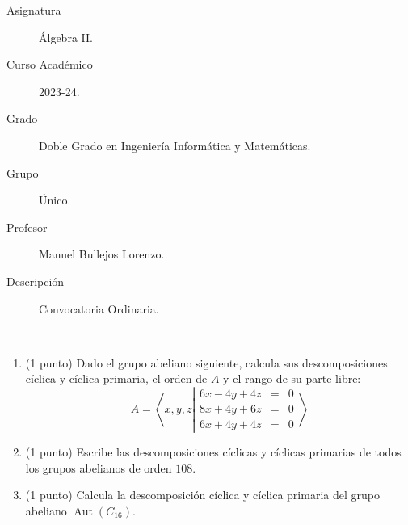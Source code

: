 \documentclass[12pt]{article}
\DeclareMathOperator{\Aut}{Aut}
\begin{document}

    
    

    \begin{description}
        \item[Asignatura] Álgebra II.
        \item[Curso Académico] 2023-24.
        \item[Grado] Doble Grado en Ingeniería Informática y Matemáticas.
        \item[Grupo] Único.
        \item[Profesor] Manuel Bullejos Lorenzo.
        \item[Descripción] Convocatoria Ordinaria.
    
    \end{description}
    \newpage

    \begin{ejercicio}~
        \begin{enumerate}
            \item (1 punto) Dado el grupo abeliano siguiente, calcula sus descomposiciones cíclica y cíclica primaria, el orden de $A$ y el rango de su parte libre:
                \[
                    A = \left\langle x, y, z \left|\begin{array}{rcl}
                        6x - 4y + 4z & = & 0 \\
                        8x + 4y + 6z & = & 0 \\
                        6x + 4y + 4z & = & 0
                    \end{array}\right.\right\rangle
                \]
            \item (1 punto) Escribe las descomposiciones cíclicas y cíclicas primarias de todos los grupos abelianos de orden $108$.
            \item (1 punto) Calcula la descomposición cíclica y cíclica primaria del grupo abeliano $\Aut(C_{16})$.
        \end{enumerate}
    \end{ejercicio}
\end{document}
